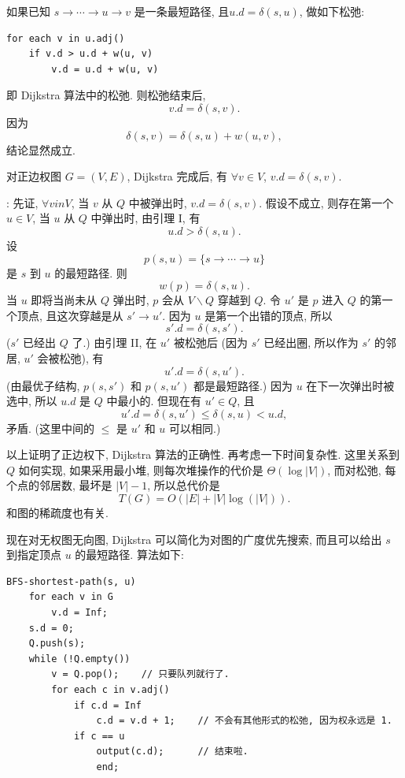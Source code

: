 \documentclass[a4paper]{ctexart}
\theoremstyle{definition}
\theoremstyle{definition}
\begin{document}
 如果已知 $s \to \cdots \to u \to v$ 是一条最短路径,
且$u.d = \delta(s, u)$, 做如下松弛:
\begin{verbatim}
for each v in u.adj()
    if v.d > u.d + w(u, v)
        v.d = u.d + w(u, v)
\end{verbatim}
即 Dijkstra 算法中的松弛. 则松弛结束后,
$$
v.d = \delta(s, v).
$$
 因为
$$
\delta(s, v) = \delta(s, u) + w(u, v),
$$
结论显然成立.

 对正边权图 $G = (V, E)$,
Dijkstra 完成后, 有 $\forall v \in V$, $v.d = \delta(s, v)$.

: 先证, $\forall v in V$, 当 $v$ 从 $Q$ 中被弹出时,
$v.d = \delta(s, v)$. 假设不成立, 则存在第一个 $u \in V$, 当 $u$ 从 $Q$ 中弹出时,
由引理 I, 有
$$
u.d > \delta(s, u).
$$
设
$$
p(s, u) = \{ s \to \cdots \to u \}
$$
是 $s$ 到 $u$ 的最短路径. 则
$$
w(p) = \delta(s, u).
$$
当 $u$ 即将当尚未从 $Q$ 弹出时, $p$ 会从 $V \backslash Q$ 穿越到 $Q$. 令 $u'$ 是
$p$ 进入 $Q$ 的第一个顶点, 且这次穿越是从 $s' \to u'$. 因为 $u$ 是第一个出错的顶点,
所以
$$
s'.d = \delta(s, s').
$$
($s'$ 已经出 $Q$ 了.) 由引理 II, 在 $u'$ 被松弛后 (因为 $s'$ 已经出圈,
所以作为 $s'$ 的邻居, $u'$ 会被松弛), 有
$$
u'.d = \delta(s, u').
$$
(由最优子结构, $p(s, s')$ 和 $p(s, u')$ 都是最短路径.)
因为 $u$ 在下一次弹出时被选中, 所以 $u.d$ 是 $Q$ 中最小的.
但现在有 $u' \in Q$, 且
$$
u'.d = \delta(s, u') \leq \delta(s, u) < u.d,
$$
矛盾. (这里中间的 $\leq$ 是 $u'$ 和 $u$ 可以相同.)

以上证明了正边权下, Dijkstra 算法的正确性. 再考虑一下时间复杂性. 这里关系到 $Q$ 如何实现,
如果采用最小堆, 则每次堆操作的代价是 $\Theta(\log |V|)$, 而对松弛, 每个点的邻居数,
最坏是 $|V| - 1$, 所以总代价是
$$
T(G) = O(|E| + |V|\log(|V|)). 
$$
和图的稀疏度也有关.

现在对无权图无向图, Dijkstra 可以简化为对图的广度优先搜索, 而且可以给出 $s$ 到指定顶点 $u$
的最短路径. 算法如下:
\begin{verbatim}
BFS-shortest-path(s, u)
    for each v in G
        v.d = Inf;
    s.d = 0;
    Q.push(s);
    while (!Q.empty())
        v = Q.pop();    // 只要队列就行了.
        for each c in v.adj()
            if c.d = Inf
                c.d = v.d + 1;    // 不会有其他形式的松弛, 因为权永远是 1.
            if c == u
                output(c.d);      // 结束啦.
                end;
\end{verbatim}

\end{document}
